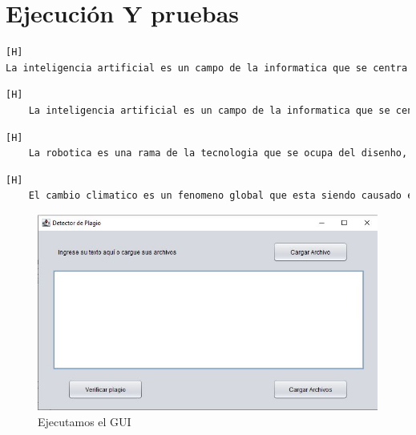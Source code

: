 \documentclass{article}
\begin{document}
	\section{Ejecución Y pruebas}
	\begin{lstlisting}[language=bash,caption={Texto original a comparar}][H]
La inteligencia artificial es un campo de la informatica que se centra en la creacion de sistemas capaces de realizar tareas que normalmente requieren inteligencia humana. El cambio climatico es un fenomeno global que esta siendo causado en gran medida por la actividad humana, como la emision de gases de efecto invernadero.
	\end{lstlisting}
	\begin{lstlisting}[language=bash,caption={Texto con plagio 1}][H]
	La inteligencia artificial es un campo de la informatica que se centra en la creacion de sistemas capaces de realizar tareas que normalmente requieren inteligencia humana.
	\end{lstlisting}
	\begin{lstlisting}[language=bash,caption={Texto original sin plagio}][H]
	La robotica es una rama de la tecnologia que se ocupa del disenho, construccion y operacion de robots con el objetivo de automatizar y facilitar diversas tareas.
	\end{lstlisting}
	\begin{lstlisting}[language=bash,caption={Texto con plagio 2}][H]
	El cambio climatico es un fenomeno global que esta siendo causado en gran medida por la actividad humana, como la emision de gases de efecto invernadero.
	\end{lstlisting}
	\begin{figure}[H]
		\centering
		\caption{Ejecutamos el GUI}
		\includegraphics[width=1\textwidth,keepaspectratio]{img/Ejec1.jpg}
	\end{figure}
\end{document}
